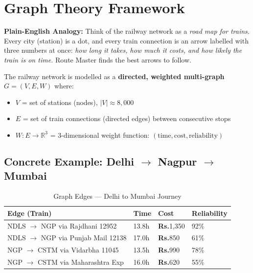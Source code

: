 \documentclass[12pt,a4paper]{report}
\begin{document}
\section{Graph Theory Framework}

\begin{tcolorbox}[keybox]
\textbf{Plain-English Analogy:} Think of the railway network as a \textit{road map for trains}. Every city (station) is a dot, and every train connection is an arrow labelled with three numbers at once: \textit{how long it takes, how much it costs, and how likely the train is on time.} Route Master finds the best arrows to follow.
\end{tcolorbox}

The railway network is modelled as a \textbf{directed, weighted multi-graph} $G = (V, E, W)$ where:

\begin{itemize}[leftmargin=1.5em]
  \item $V$ = set of stations (nodes), $|V| \approx 8{,}000$
  \item $E$ = set of train connections (directed edges) between consecutive stops
  \item $W : E \to \mathbb{R}^3$ = 3-dimensional weight function: $(\text{time}, \text{cost}, \text{reliability})$
\end{itemize}

\subsection*{Concrete Example: Delhi $\to$ Nagpur $\to$ Mumbai}

\begin{table}[h!]
\centering
\caption{Graph Edges --- Delhi to Mumbai Journey}
\begin{tabularx}{\textwidth}{lXXX}
\toprule
\textbf{Edge (Train)} & \textbf{Time} & \textbf{Cost} & \textbf{Reliability} \\
\midrule
NDLS $\to$ NGP via Rajdhani 12952 & 13.8h & \textbf{Rs.}1,350 & 92\% \\
NDLS $\to$ NGP via Punjab Mail 12138 & 17.0h & \textbf{Rs.}850 & 61\% \\
NGP $\to$ CSTM via Vidarbha 11045 & 13.5h & \textbf{Rs.}990 & 78\% \\
NGP $\to$ CSTM via Maharashtra Exp & 16.0h & \textbf{Rs.}620 & 55\% \\
\bottomrule
\end{tabularx}
\end{table}
\end{document}
